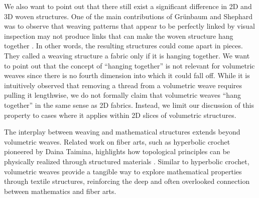 \documentclass[unnumsec,webpdf,contemporary,large]{oup-authoring-template}%
\theoremstyle{thmstyleone}%
\theoremstyle{thmstyletwo}%
\theoremstyle{thmstylethree}%
\begin{document}
{We also want to point out that there still exist a significant difference in 2D and 3D woven structures. One of the main contributions of Gr\"unbaum and Shephard was to observe that weaving patterns that appear to be perfectly linked by visual inspection may not produce links that can make the woven structure hang together \cite{Grunbaum80,Grunbaum85, Grunbaum86, grunbaum1988isonemal, Griswold2004a, Griswold2004b, Griswold2004c}. In other words, the resulting structures could come apart in pieces. They called a weaving structure a fabric only if it is hanging together. We want to point out that the concept of “hanging together” is not relevant for volumetric weaves since there is no fourth dimension into which it could fall off. While it is intuitively observed that removing a thread from a volumetric weave requires pulling it lengthwise, we do not formally claim that volumetric weaves “hang together” in the same sense as 2D fabrics. Instead, we limit our discussion of this property to cases where it applies within 2D slices of volumetric structures.

The interplay between weaving and mathematical structures extends beyond volumetric weaves. Related work on fiber arts, such as hyperbolic crochet pioneered by Daina Taimina, highlights how topological principles can be physically realized through structured materials \cite{taimina2018crocheting}. Similar to hyperbolic crochet, volumetric weaves provide a tangible way to explore mathematical properties through textile structures, reinforcing the deep and often overlooked connection between mathematics and fiber arts.}




\end{document}
